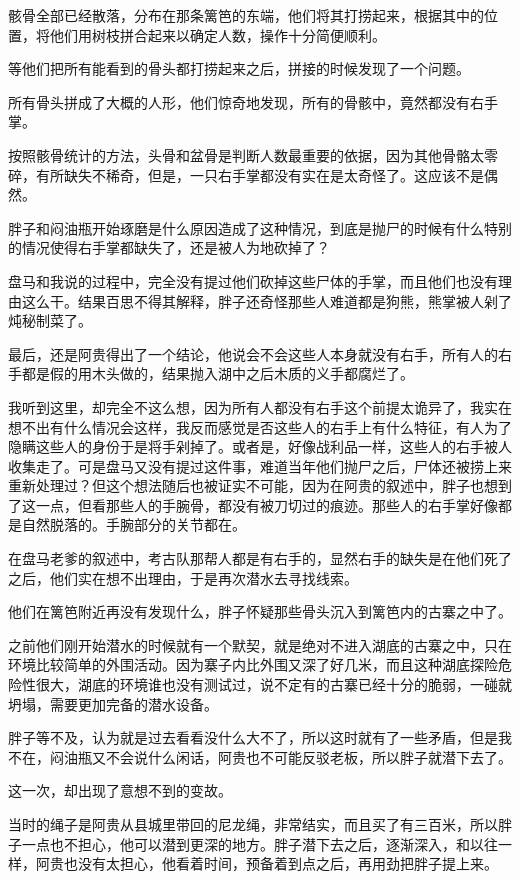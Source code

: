骸骨全部已经散落，分布在那条篱笆的东端，他们将其打捞起来，根据其中的位置，将他们用树枝拼合起来以确定人数，操作十分简便顺利。

等他们把所有能看到的骨头都打捞起来之后，拼接的时候发现了一个问题。

所有骨头拼成了大概的人形，他们惊奇地发现，所有的骨骸中，竟然都没有右手掌。

按照骸骨统计的方法，头骨和盆骨是判断人数最重要的依据，因为其他骨骼太零碎，有所缺失不稀奇，但是，一只右手掌都没有实在是太奇怪了。这应该不是偶然。

胖子和闷油瓶开始琢磨是什么原因造成了这种情况，到底是抛尸的时候有什么特别的情况使得右手掌都缺失了，还是被人为地砍掉了？

盘马和我说的过程中，完全没有提过他们砍掉这些尸体的手掌，而且他们也没有理由这么干。结果百思不得其解释，胖子还奇怪那些人难道都是狗熊，熊掌被人剁了炖秘制菜了。

最后，还是阿贵得出了一个结论，他说会不会这些人本身就没有右手，所有人的右手都是假的用木头做的，结果抛入湖中之后木质的义手都腐烂了。

我听到这里，却完全不这么想，因为所有人都没有右手这个前提太诡异了，我实在想不出有什么情况会这样，我反而感觉是否这些人的右手上有什么特征，有人为了隐瞒这些人的身份于是将手剁掉了。或者是，好像战利品一样，这些人的右手被人收集走了。可是盘马又没有提过这件事，难道当年他们抛尸之后，尸体还被捞上来重新处理过？但这个想法随后也被证实不可能，因为在阿贵的叙述中，胖子也想到了这一点，但看那些人的手腕骨，都没有被刀切过的痕迹。那些人的右手掌好像都是自然脱落的。手腕部分的关节都在。

在盘马老爹的叙述中，考古队那帮人都是有右手的，显然右手的缺失是在他们死了之后，他们实在想不出理由，于是再次潜水去寻找线索。

他们在篱笆附近再没有发现什么，胖子怀疑那些骨头沉入到篱笆内的古寨之中了。

之前他们刚开始潜水的时候就有一个默契，就是绝对不进入湖底的古寨之中，只在环境比较简单的外围活动。因为寨子内比外围又深了好几米，而且这种湖底探险危险性很大，湖底的环境谁也没有测试过，说不定有的古寨已经十分的脆弱，一碰就坍塌，需要更加完备的潜水设备。

胖子等不及，认为就是过去看看没什么大不了，所以这时就有了一些矛盾，但是我不在，闷油瓶又不会说什么闲话，阿贵也不可能反驳老板，所以胖子就潜下去了。

这一次，却出现了意想不到的变故。

当时的绳子是阿贵从县城里带回的尼龙绳，非常结实，而且买了有三百米，所以胖子一点也不担心，他可以潜到更深的地方。胖子潜下去之后，逐渐深入，和以往一样，阿贵也没有太担心，他看着时间，预备着到点之后，再用劲把胖子提上来。

